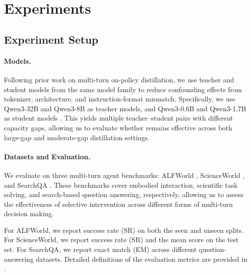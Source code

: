 \section{Experiments}
\label{sec:experiments}

\subsection{Experiment Setup}
\label{sec:setup}

\paragraph{Models.}
Following prior work on multi-turn on-policy distillation, we use teacher and student models from the same model family to reduce confounding effects from tokenizer, architecture, and instruction-format mismatch. Specifically, we use Qwen3-32B and Qwen3-8B as teacher models, and Qwen3-0.6B and Qwen3-1.7B as student models \citep{yang2025qwen3}. This yields multiple teacher--student pairs with different capacity gaps, allowing us to evaluate whether \ours{} remains effective across both large-gap and moderate-gap distillation settings.

\paragraph{Datasets and Evaluation.}
We evaluate \ours{} on three multi-turn agent benchmarks: ALFWorld \citep{shridhar2020alfworld}, ScienceWorld \citep{wang2022scienceworld}, and SearchQA \citep{jin2025search}. These benchmarks cover embodied interaction, scientific task solving, and search-based question answering, respectively, allowing us to assess the effectiveness of selective intervention across different forms of multi-turn decision making.

For ALFWorld, we report success rate (SR) on both the seen and unseen splits. For ScienceWorld, we report success rate (SR) and the mean score on the test set. For SearchQA, we report exact match (EM) across different question-answering datasets. Detailed definitions of the evaluation metrics are provided in .

